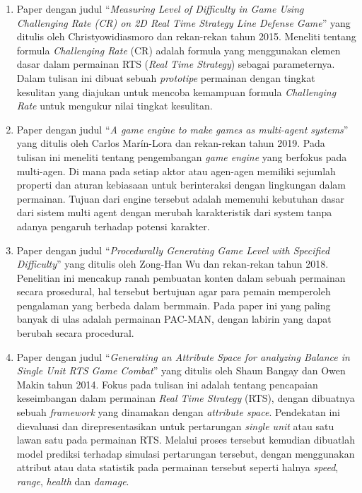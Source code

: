 \begin{enumerate}
	\item Paper dengan judul ``\textit{Measuring Level of Difficulty in Game Using Challenging Rate (CR) on 2D Real Time Strategy Line Defense Game}'' yang ditulis oleh Christyowidiasmoro dan rekan-rekan tahun 2015. Meneliti tentang formula \textit{Challenging Rate} (CR) adalah formula yang menggunakan elemen dasar dalam permainan RTS (\textit{Real Time Strategy}) sebagai parameternya. Dalam tulisan ini dibuat sebuah \textit{prototipe} permainan dengan tingkat kesulitan yang diajukan untuk mencoba kemampuan formula \textit{Challenging Rate} untuk mengukur nilai tingkat kesulitan.

	\item Paper dengan judul ``\textit{A game engine to make games as multi-agent systems}'' yang ditulis oleh Carlos Marín-Lora dan rekan-rekan tahun 2019. Pada tulisan ini meneliti tentang pengembangan \textit{game engine} yang berfokus pada multi-agen. Di mana pada setiap aktor atau agen-agen memiliki sejumlah properti dan aturan kebiasaan untuk berinteraksi dengan lingkungan dalam permainan. Tujuan dari engine tersebut adalah memenuhi kebutuhan dasar dari sistem multi agent dengan merubah karakteristik dari system tanpa adanya pengaruh terhadap potensi karakter.

	\item Paper dengan judul ``\textit{Procedurally Generating Game Level with Specified Difficulty}'' yang ditulis oleh Zong-Han Wu dan rekan-rekan tahun 2018. Penelitian ini mencakup ranah pembuatan konten dalam sebuah permainan secara prosedural, hal tersebut bertujuan agar para pemain memperoleh pengalaman yang berbeda dalam bermmain. Pada paper ini yang paling banyak di ulas adalah permainan PAC-MAN, dengan labirin yang dapat berubah secara procedural.
	
	\item Paper dengan judul ``\textit{Generating an Attribute Space for analyzing Balance in Single Unit RTS Game Combat}'' yang ditulis oleh Shaun Bangay dan Owen Makin tahun 2014. Fokus pada tulisan ini adalah tentang pencapaian keseimbangan dalam permainan \textit{Real Time Strategy} (RTS), dengan dibuatnya sebuah \textit{framework} yang dinamakan dengan \textit{attribute space}. Pendekatan ini dievaluasi dan direpresentasikan untuk pertarungan \textit{single unit} atau satu lawan satu pada permainan RTS. Melalui proses tersebut kemudian dibuatlah model prediksi terhadap simulasi pertarungan tersebut, dengan menggunakan attribut atau data statistik pada permainan tersebut seperti halnya \textit{speed}, \textit{range}, \textit{health} dan \textit{damage}.
\end{enumerate}

